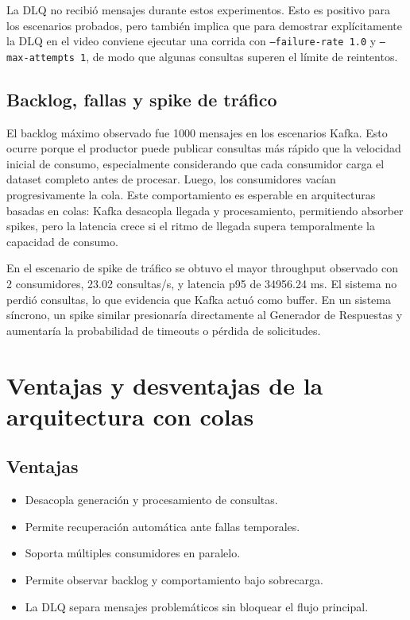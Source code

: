 \documentclass[11pt,letterpaper]{article}
\begin{document}
La DLQ no recibió mensajes durante estos experimentos. Esto es positivo para los escenarios probados, pero también implica que para demostrar explícitamente la DLQ en el video conviene ejecutar una corrida con \texttt{--failure-rate 1.0} y \texttt{--max-attempts 1}, de modo que algunas consultas superen el límite de reintentos.

\subsection{Backlog, fallas y spike de tráfico}

El backlog máximo observado fue 1000 mensajes en los escenarios Kafka. Esto ocurre porque el productor puede publicar consultas más rápido que la velocidad inicial de consumo, especialmente considerando que cada consumidor carga el dataset completo antes de procesar. Luego, los consumidores vacían progresivamente la cola. Este comportamiento es esperable en arquitecturas basadas en colas: Kafka desacopla llegada y procesamiento, permitiendo absorber spikes, pero la latencia crece si el ritmo de llegada supera temporalmente la capacidad de consumo.

En el escenario de spike de tráfico se obtuvo el mayor throughput observado con 2 consumidores, 23.02 consultas/s, y latencia p95 de 34956.24 ms. El sistema no perdió consultas, lo que evidencia que Kafka actuó como buffer. En un sistema síncrono, un spike similar presionaría directamente al Generador de Respuestas y aumentaría la probabilidad de timeouts o pérdida de solicitudes.

\section{Ventajas y desventajas de la arquitectura con colas}

\subsection{Ventajas}

\begin{itemize}
    \item Desacopla generación y procesamiento de consultas.
    \item Permite recuperación automática ante fallas temporales.
    \item Soporta múltiples consumidores en paralelo.
    \item Permite observar backlog y comportamiento bajo sobrecarga.
    \item La DLQ separa mensajes problemáticos sin bloquear el flujo principal.
\end{itemize}
\end{document}
